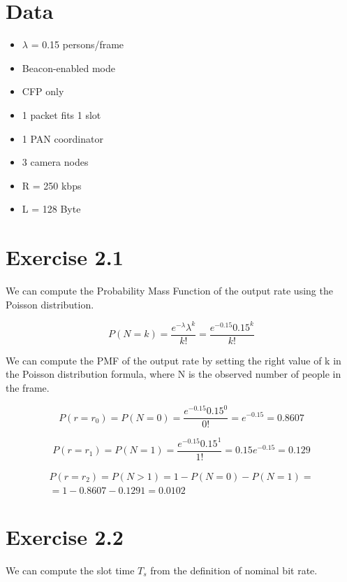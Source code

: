\section{Data}
\begin{itemize}
\item $\lambda$ = 0.15 persons/frame
\item Beacon-enabled mode
\item CFP only
\item 1 packet fits 1 slot
\item 1 PAN coordinator
\item 3 camera nodes
\item R = 250 kbps
\item L = 128 Byte
\end{itemize}

\section{Exercise 2.1}
We can compute the Probability Mass Function of the output rate using the Poisson distribution.

\begin{equation}
P(N = k) = \frac{e^{-\lambda} \lambda^k}{k!} = \frac{e^{-0.15} 0.15^k}{k!}
\end{equation}

We can compute the PMF of the output rate by setting the right value of k in the Poisson distribution formula, where N is the observed number of people in the frame.

\begin{equation}
P(r = r_0) = P(N = 0) = \frac{e^{-0.15} 0.15^0}{0!} = e^{-0.15} = 0.8607
\end{equation}

\begin{equation}
P(r = r_1) = P(N = 1) = \frac{e^{-0.15} 0.15^1}{1!} = 0.15 e^{-0.15} = 0.129
\end{equation}

\begin{equation}
\begin{split}
	P(r = r_2) = P(N > 1) = 1 - P(N = 0) - P(N = 1) = \\
	= 1- 0.8607 - 0.1291 = 0.0102
\end{split}
\end{equation}

\section{Exercise 2.2}
We can compute the slot time $T_{s}$ from the definition of nominal bit rate.

